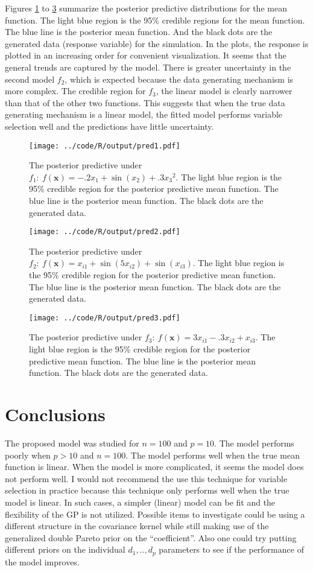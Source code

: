 \documentclass[11pt]{article}
\def\beginmyfig{\begin{figure}[H]\center} %
\def\endmyfig{\end{figure}}
\begin{document}
Figures \ref{fig:pp1} to \ref{fig:pp3} summarize the posterior predictive distributions
for the mean function. The light blue region is the 95\% credible regions for the
mean function. The blue line is the posterior mean function. And the black dots
are the generated data (response variable) for the simulation. In the plots, 
the response is plotted in an increasing order for convenient visualization.
It seems that the general trends are captured by the model. There is greater
uncertainty in the second model $f_2$, which is expected because the data
generating mechanism is more complex. The credible region for $f_3$, the linear
model is clearly narrower than that of the other two functions. This suggests
that when the true data generating mechanism is a linear model, the fitted model
performs variable selection well and the predictions have little uncertainty.
\beginmyfig 
  \texttt{[image: ../code/R/output/pred1.pdf]} 
  \caption{The posterior predictive under $f_1:~ f(\bm x) = -.2x_1 + \sin(x_2) + .3{x_3}^2$.
  The light blue region is the 95\% credible region for the posterior
  predictive mean function. The blue line is the posterior mean function. The
  black dots are the generated data.}
  \label{fig:pp1}
\endmyfig 
\beginmyfig 
  \texttt{[image: ../code/R/output/pred2.pdf]} 
  \caption{The posterior predictive under $f_2:~ f(\bm x) = x_{i1} + \sin(5x_{i2}) + \sin(x_{i3})$.  
  The light blue region is the 95\% credible
  region for the posterior predictive mean function. The blue line is the
  posterior mean function. The black dots are the generated data.}
  \label{fig:pp2}
\endmyfig 
\beginmyfig 
  \texttt{[image: ../code/R/output/pred3.pdf]} 
  \caption{The posterior predictive under $f_3:~ f(\bm x) = 3x_{i1} - .3x_{i2} + x_{i3} $.
  The light blue region is the 95\% credible region for the posterior predictive mean function. The blue
  line is the posterior mean function. The black dots are the generated data.}
  \label{fig:pp3}
\endmyfig 

\section{Conclusions}
The proposed model was studied for $n=100$ and $p=10$. The model performs
poorly when $p>10$ and $n=100$. The model performs well when the true mean
function is linear. When the model is more complicated, it seems the model does
not perform well. I would not recommend the use this technique for variable
selection in practice because this technique only performs well when the true
model is linear. In such cases, a simpler (linear) model can be fit and the
flexibility of the GP is not utilized. Possible items to investigate could be
using a different structure in the covariance kernel while still making use of
the generalized double Pareto prior on the ``coefficient''. Also one could try
putting different priors on the individual $d_1,..,d_p$ parameters to see if
the performance of the model improves.
\end{document}
